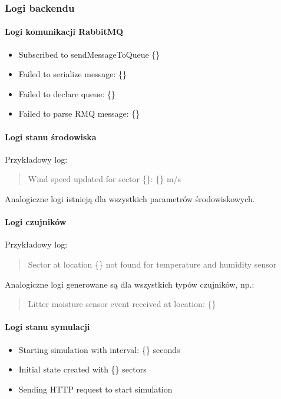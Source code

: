 \documentclass[11pt,a4paper]{article}
\begin{document}
\subsubsection{Logi backendu}

\paragraph{Logi komunikacji RabbitMQ}

\begin{itemize}
    \item Subscribed to sendMessageToQueue \{\}
    \item Failed to serialize message: \{\}
    \item Failed to declare queue: \{\}
    \item Failed to parse RMQ message: \{\}
\end{itemize}

\paragraph{Logi stanu środowiska}

Przykładowy log:
\begin{quote}
Wind speed updated for sector \{\}: \{\} m/s
\end{quote}

Analogiczne logi istnieją dla wszystkich parametrów środowiskowych.

\paragraph{Logi czujników}

Przykładowy log:
\begin{quote}
Sector at location \{\} not found for temperature and humidity sensor
\end{quote}

Analogiczne logi generowane są dla wszystkich typów czujników, np.:
\begin{quote}
Litter moisture sensor event received at location: \{\}
\end{quote}

\paragraph{Logi stanu symulacji}

\begin{itemize}
    \item Starting simulation with interval: \{\} seconds
    \item Initial state created with \{\} sectors
    \item Sending HTTP request to start simulation
\end{itemize}
\end{document}
